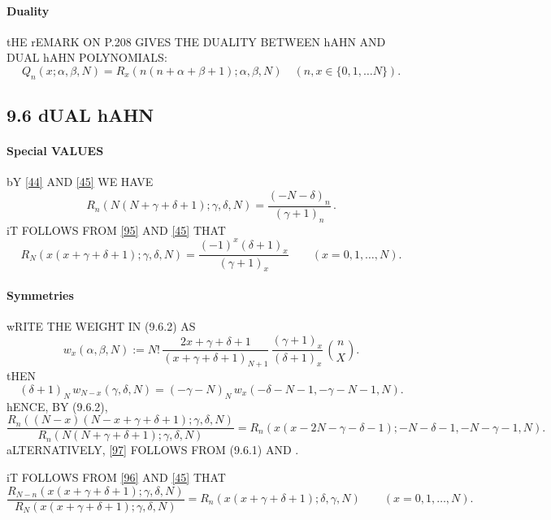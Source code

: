 \documentclass[twoside,11pt]{article}
\newcommand\al\alpha
\newcommand\be\beta
\newcommand\ga\gamma
\newcommand\de\delta
\begin{document}
\paragraph{Duality} 
tHE rEMARK ON P.208 GIVES THE DUALITY BETWEEN hAHN AND DUAL hAHN POLYNOMIALS: 
% 
\begin{equation} 
Q_n(x;\al,\be,N)=R_x(n(n+\al+\be+1);\al,\be,N)\quad(n,x\in\{0,1,\ldots N\}). 
\label{45} 
\end{equation} 
% 
\subsection*{9.6 dUAL hAHN} 
\label{sec9.6} 
% 
\paragraph{Special VALUES} 
bY \eqref{44} AND \eqref{45} WE HAVE 
\begin{equation} 
R_n(N(N+\ga+\de+1);\ga,\de,N)=\frac{(-N-\de)_n}{(\ga+1)_n}\,. 
\label{47} 
\end{equation} 
iT FOLLOWS FROM \eqref{95} AND \eqref{45} THAT 
\begin{equation} 
R_N(x(x+\ga+\de+1);\ga,\de,N) 
=\frac{(-1)^x(\de+1)_x}{(\ga+1)_x}\qquad(x=0,1,\ldots,N). 
\label{101} 
\end{equation} 
% 
\paragraph{Symmetries} 
wRITE THE WEIGHT IN (9.6.2) AS 
\begin{equation} 
w_x(\al,\be,N):=N!\,\frac{2x+\ga+\de+1}{(x+\ga+\de+1)_{N+1}}\, 
\frac{(\ga+1)_x}{(\de+1)_x}\,\binom nX. 
\label{98} 
\end{equation} 
tHEN 
\begin{equation} 
(\de+1)_N\,w_{N-x}(\ga,\de,N)= 
(-\ga-N)_N\,w_x(-\de-N-1,-\ga-N-1,N). 
\label{99} 
\end{equation} 
hENCE, BY (9.6.2), 
\begin{equation} 
\frac{R_n((N-x)(N-x+\ga+\de+1);\ga,\de,N)}{R_n(N(N+\ga+\de+1);\ga,\de,N)} 
=R_n(x(x-2N-\ga-\de-1);-N-\de-1,-N-\ga-1,N). 
\label{97} 
\end{equation} 
aLTERNATIVELY, \eqref{97} FOLLOWS FROM (9.6.1) AND 
. 
 
iT FOLLOWS FROM \eqref{96} AND \eqref{45} THAT 
\begin{equation} 
\frac{R_{N-n}(x(x+\ga+\de+1);\ga,\de,N)} 
{R_N(x(x+\ga+\de+1);\ga,\de,N)} 
=R_n(x(x+\ga+\de+1);\de,\ga,N)\qquad(x=0,1,\ldots,N). 
\label{102} 
\end{equation} 
% 
\end{document}
